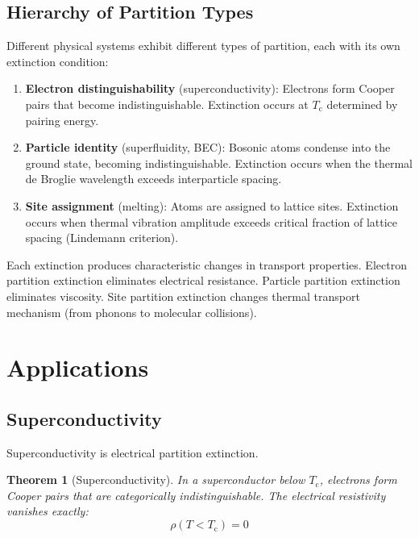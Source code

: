 \documentclass[twocolumn,10pt,aps,prd,superscriptaddress,nofootinbib]{revtex4-2}
\newtheorem{theorem}{Theorem}[section]
\theoremstyle{remark}
\newcommand{\Tcrit}{T_{\mathrm{c}}}
\begin{document}
\subsection{Hierarchy of Partition Types}

Different physical systems exhibit different types of partition, each with its own extinction condition:

\begin{enumerate}
\item \textbf{Electron distinguishability} (superconductivity): Electrons form Cooper pairs that become indistinguishable. Extinction occurs at $\Tcrit$ determined by pairing energy.

\item \textbf{Particle identity} (superfluidity, BEC): Bosonic atoms condense into the ground state, becoming indistinguishable. Extinction occurs when the thermal de Broglie wavelength exceeds interparticle spacing.

\item \textbf{Site assignment} (melting): Atoms are assigned to lattice sites. Extinction occurs when thermal vibration amplitude exceeds critical fraction of lattice spacing (Lindemann criterion).
\end{enumerate}

Each extinction produces characteristic changes in transport properties. Electron partition extinction eliminates electrical resistance. Particle partition extinction eliminates viscosity. Site partition extinction changes thermal transport mechanism (from phonons to molecular collisions).


\section{Applications}
\label{sec:applications}

\subsection{Superconductivity}

Superconductivity is electrical partition extinction.

\begin{theorem}[Superconductivity]
\label{thm:superconductivity}
In a superconductor below $\Tcrit$, electrons form Cooper pairs that are categorically indistinguishable. The electrical resistivity vanishes exactly:
\begin{equation}
\rho(T < \Tcrit) = 0
\label{eq:superconductivity}
\end{equation}
\end{theorem}
\end{document}
